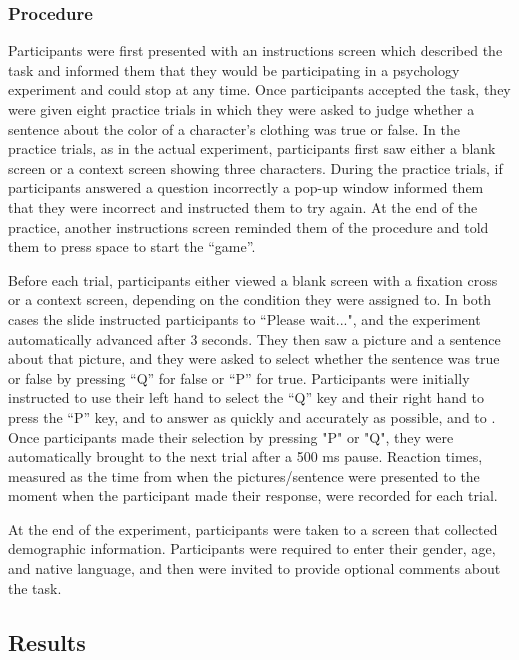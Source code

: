 \documentclass[10pt,letterpaper]{article}
\begin{document}
\subsubsection{Procedure}

Participants were first presented with an instructions screen which described the task and informed them that they would be participating in a psychology experiment and could stop at any time.  Once participants accepted the task, they were given eight practice trials in which they were asked to judge whether a sentence about the color of a character's clothing was true or false.  In the practice trials, as in the actual experiment, participants first saw either a blank screen or a context screen showing three characters.  During the practice trials, if participants answered a question incorrectly a pop-up window informed them that they were incorrect and instructed them to try again.  At the end of the practice, another instructions screen reminded them of the procedure and told them to press space to start the ``game''.  

Before each trial, participants either viewed a blank screen with a fixation cross or a context screen, depending on the condition they were assigned to.  In both cases the slide instructed participants to ``Please wait...", and the experiment automatically advanced after 3 seconds.  They then saw a picture and a sentence about that picture, and they were asked to select whether the sentence was true or false by pressing ``Q'' for false or ``P'' for true.  Participants were initially instructed to  use their left hand to select the ``Q'' key and their right hand to press the ``P'' key, and to answer as quickly and accurately as possible, and to .  Once participants made their selection by pressing "P" or "Q", they were automatically brought to the next trial after a 500 ms pause.  Reaction times, measured as the time from when the pictures/sentence were presented to the moment when the participant made their response, were recorded for each trial.

At the end of the experiment, participants were taken to a screen that collected demographic information.  Participants were required to enter their gender, age, and native language, and then were invited to provide optional comments about the task.  

\subsection{Results}
\end{document}
